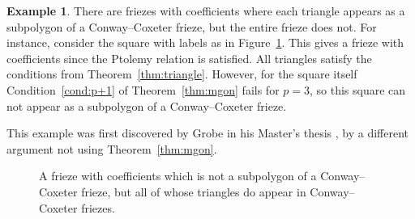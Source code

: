 \documentclass[10pt]{amsart}
\numberwithin{equation}{section}
\theoremstyle{definition}
\newtheorem{exam}[theo]{Example}
\theoremstyle{remark}
\begin{document}
\begin{exam} \label{ex:grobe}
There are friezes with coefficients where each triangle appears 
as a subpolygon of a Conway--Coxeter frieze, but the entire frieze does not.
For instance, consider the square with labels as 
in Figure~\ref{fig:exsquare}. 
This gives a frieze with coefficients since the Ptolemy relation is satisfied.
All triangles satisfy the conditions from Theorem~\ref{thm:triangle}. However,
for the square itself Condition~\eqref{cond:p+1} of Theorem~\ref{thm:mgon}
fails for $p=3$, so this square can not appear as a subpolygon of a 
Conway--Coxeter frieze. 

This example was first discovered by Grobe in his Master's thesis 
\cite{Grobe}, by a different argument not using Theorem~\ref{thm:mgon}. 

\begin{figure}[htb]\centering
{}
 \caption{A frieze with coefficients which is not a subpolygon of a 
 Conway--Coxeter frieze, but all of whose triangles do appear in
 Conway--Coxeter friezes. 
 \label{fig:exsquare}}
\end{figure}
\end{exam}
\end{document}
